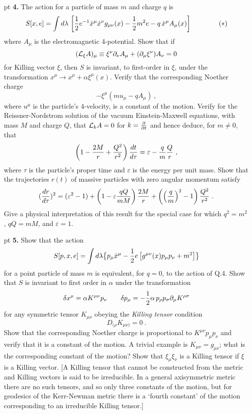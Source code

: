  pt
 \noindent
{\bf 4.} The action for a particle of mass $m$ and charge $q$ is
$$
S[x,e] =\int d\lambda\,\left[{1\over2} e^{-1}\dot x^\mu\dot x^\nu
g_{\mu\nu}(x) -{1\over2}m^2 e -q\, \dot x^\mu A_\mu(x)\right]\qquad
\qquad (*) 
$$
where $A_\mu$ is the electromagnetic 4-potential. Show
that if
$$
({\cal L}_\xi A)_\mu \equiv \xi^\nu\partial_\nu A_\mu +
(\partial_\mu \xi^\nu) A_\nu =0
$$
for Killing vector $\xi$, then $S$ is invariant, to first-order in
$\xi$, under the transformation $x^\mu\rightarrow x^\mu
+\alpha\xi^\mu(x)$. Verify that the corresponding Noether charge
$$
-\xi^\mu \left(m u_\mu -q A_\mu\right)\ ,
$$ 
where $u^\mu$ is the particle's 4-velocity, is a constant of the 
motion. Verify for the Reissner-Nordstrom solution of the vacuum
Einstein-Maxwell equations, with mass $M$ and charge $Q$, that ${\cal
L}_k A =0$ for $k={\partial\over \partial t}$ and hence deduce, for
$m\ne 0$, that  
$$
\left(1-{2M\over r} + {Q^2\over r^2}\right) {dt\over d\tau} =
\varepsilon -{q\over m}{Q\over r}\ ,
$$
where $\tau$ is the particle's proper time and $\varepsilon$ is the
energy per unit mass. Show that the trajectories $r(t)$ of
massive particles with zero angular momentum satisfy
$$
({dr\over d\tau})^2 = (\varepsilon^2 -1) + \left(1-\varepsilon
{qQ\over mM}\right){2M\over r} +\left(\left({q\over m}\right)^2
-1\right){Q^2\over r^2}\ .
$$
Give a physical interpretation of this result for the special case
for which $q^2=m^2$, $qQ=mM$, and $\varepsilon=1$.


 pt
\noindent
{\bf 5.} Show that the action
$$
S[p,x,e]=\int d\lambda \big\{ p_\mu \dot x^\mu
-{1\over2}e\, \big[g^{\mu\nu}(x)p_\mu p_\nu + m^2\big]\big\}
$$
for a point particle of mass $m$ is equivalent, for $q=0$, to the action
of Q.4. Show that $S$ is invariant to
first order in $\alpha$ under the transformation
$$
\delta x^\mu =\alpha K^{\mu\nu}p_\nu \qquad \delta p_\mu
=-{1\over2}\alpha\, p_\rho p_\sigma \partial_\mu K^{\rho\sigma}
$$
for any symmetric tensor $K_{\mu\nu}$ obeying the {\it Killing
tensor} condition
$$
D_{(\rho} K_{\mu\nu)}=0\ .
$$
Show that the corresponding Noether charge is proportional to
$K^{\mu\nu}p_\mu p_\nu$ and verify that it is a constant of the
motion. A trivial example is $K_{\mu\nu}=g_{\mu\nu}$; what is
the corresponding constant of the motion? Show that
$\xi_\mu\xi_\nu$ is a Killing tensor if $\xi$ is a Killing vector. [A
Killing tensor that cannot be constructed from the metric and Killing
vectors is said to be irreducible. In a general axisymmetric
metric there are no such tensors, and so only three constants of the
motion, but for geodesics of the Kerr-Newman metric there is a 
`fourth constant' of the motion corresponding to an
irreducible Killing tensor.]

